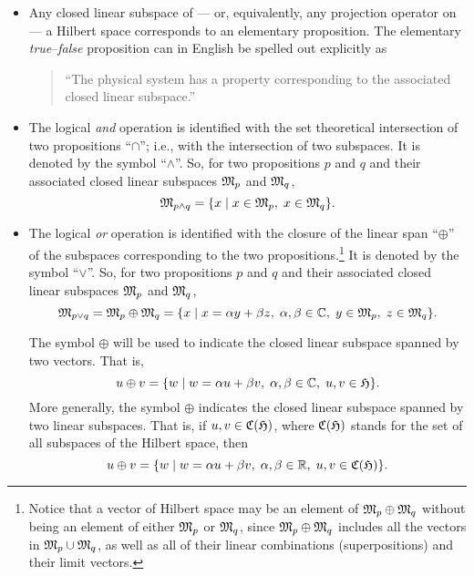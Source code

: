 \documentclass[%
  preprint,
 showpacs,
 showkeys,
 preprintnumbers,
 amsmath,amssymb,
 aps,
 rmp,
  longbibliography,
 ]{revtex4-1}
\begin{document}
\begin{itemize}
\item
Any closed linear
subspace of --- or, equivalently, any
projection operator on --- a Hilbert space corresponds to an elementary
proposition. The elementary {\it true}--{\it false} proposition can in
English be spelled out explicitly as
\begin{quote}
``The physical system has a property corresponding to the associated
closed linear subspace.''
\end{quote}

\item
The logical {\it and} operation is identified with the set
theoretical intersection of two propositions ``$\cap$''; i.e., with the
intersection of two subspaces.
It is denoted by the symbol ``$\wedge$''.
So, for two
propositions $p$ and $q$ and their associated closed linear
subspaces
${\frak M}_p$ and
${\frak M}_q$,
$$
{\frak M}_{p\wedge q} = \{x \mid x\in
{\frak M}_p, \;
x\in {\frak M}_q\} .$$


\item
The logical {\it or} operation is identified with the closure of the
linear span ``$\oplus$'' of the subspaces corresponding to the two
propositions.\footnote{
Notice that
a vector of Hilbert space may be an element of
$
{\frak M}_{p} \oplus
{\frak M}_{q}
$
without being an element of either
$
{\frak M}_{p} $ or
${\frak M}_{q}
$, since
$
{\frak M}_{p} \oplus
{\frak M}_{q}
$
includes all the vectors in
$
{\frak M}_{p} \cup
{\frak M}_{q}
$, as well as all of their linear combinations (superpositions) and
their limit vectors.
}
 It is denoted by the symbol ``$\vee$''.
So, for two
propositions $p$ and $q$ and their associated closed linear
subspaces
${\frak M}_p$ and
${\frak M}_q$,
$$
{\frak M}_{p\vee q} =
{\frak M}_{p} \oplus
{\frak M}_{q} =
 \{x \mid x=\alpha y+\beta z,\; \alpha,\beta \in {\Bbb C},\; y\in
{\frak M}_p, \;
z\in {\frak M}_q\} .$$



The symbol $\oplus$ will be used to indicate the closed linear subspace
spanned by two vectors. That is,
$$u\oplus v=\{ w\mid w=\alpha u+ \beta v,\; \alpha,\beta \in {\Bbb C}
,\; u,v \in {\frak H}\}.$$
More generally, the symbol $\oplus$  indicates the closed linear
subspace spanned by two linear subspaces.
That is, if $u,v\in {\frak C}({{\frak H}})$, where ${\frak
C}({{\frak H}})$
stands for the set of all subspaces of the Hilbert space, then
$$u\oplus v=\{ w\mid w=\alpha u+ \beta v,\; \alpha,\beta \in {\Bbb R}
,\; u,v \in {\frak C}({{\frak H}}) \}.$$


\end{itemize}
\end{document}
